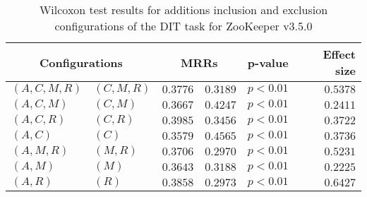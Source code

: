 
\begin{table}
\begin{spacing}{1.2}
\centering
\caption{Wilcoxon test results for additions inclusion and exclusion configurations of the DIT task for ZooKeeper v3.5.0}
\label{table:versus-wilcox-zookeeper-dit-additions}
\begin{tabular}{ll|rr|rr}
\toprule
      \multicolumn{2}{c|}{Configurations} &          \multicolumn{2}{c|}{MRRs} &       p-value & Effect size \\
\midrule
 $(A,C,M,R)$ &  $(C,M,R)$ & $0.3776$ & $0.3189$ & $p<0.01$ &    $0.5378$ \\
   $(A,C,M)$ &    $(C,M)$ & $0.3667$ & $0.4247$ & $p<0.01$ &    $0.2411$ \\
   $(A,C,R)$ &    $(C,R)$ & $0.3985$ & $0.3456$ & $p<0.01$ &    $0.3722$ \\
     $(A,C)$ &      $(C)$ & $0.3579$ & $0.4565$ & $p<0.01$ &    $0.3736$ \\
   $(A,M,R)$ &    $(M,R)$ & $0.3706$ & $0.2970$ & $p<0.01$ &    $0.5231$ \\
     $(A,M)$ &      $(M)$ & $0.3643$ & $0.3188$ & $p<0.01$ &    $0.2225$ \\
     $(A,R)$ &      $(R)$ & $0.3858$ & $0.2973$ & $p<0.01$ &    $0.6427$ \\
\bottomrule
\end{tabular}

\end{spacing}
\end{table}

